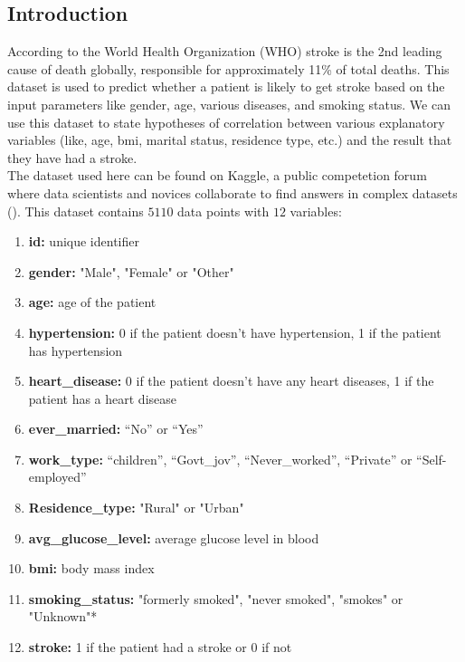 \documentclass[boxes, qed]{homework}
\begin{document}
\subsection*{Introduction}
According to the World Health Organization (WHO) stroke is the 2nd leading cause of death globally, 
responsible for approximately 11\% of total deaths. This dataset is used to predict whether a patient
is likely to get stroke based on the input parameters like gender, age, various diseases, and smoking 
status. We can use this dataset to state hypotheses of correlation between various explanatory
variables (like, age, bmi, marital status, residence type, etc.) and the result that they have had
a stroke.\\
The dataset used here can be found on Kaggle, a public competetion forum
where data scientists and novices collaborate to find answers in complex datasets
(\cite{kaggle}). This dataset contains $5110$ data points with $12$ variables:
\begin{enumerate}
  \item \textbf{id:} unique identifier
  \item \textbf{gender:} "Male", "Female" or "Other"
  \item \textbf{age:} age of the patient
  \item \textbf{hypertension:} 0 if the patient doesn't have hypertension, 1 if the patient has hypertension
  \item \textbf{heart\_disease:} 0 if the patient doesn't have any heart diseases, 1 if the patient has a heart disease
  \item \textbf{ever\_married:} ``No'' or ``Yes''
  \item \textbf{work\_type:} ``children'', ``Govt\_jov'', ``Never\_worked'', ``Private'' or ``Self-employed''
  \item \textbf{Residence\_type:} "Rural" or "Urban"
  \item \textbf{avg\_glucose\_level:} average glucose level in blood
  \item \textbf{bmi:} body mass index
  \item \textbf{smoking\_status:} "formerly smoked", "never smoked", "smokes" or "Unknown"*
  \item \textbf{stroke:} 1 if the patient had a stroke or 0 if not
\end{enumerate}
\end{document}
